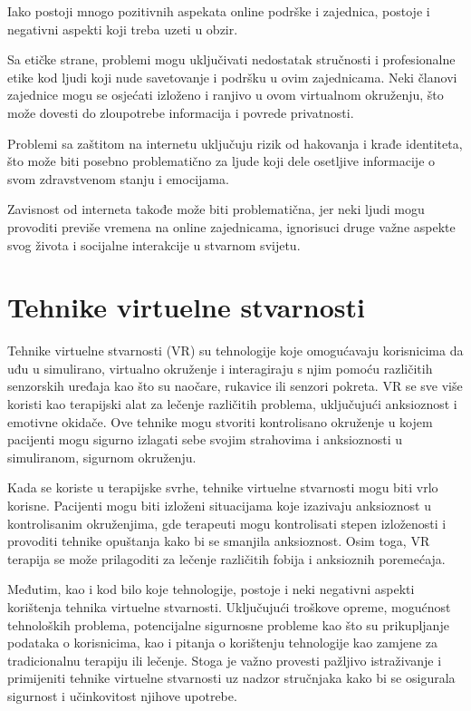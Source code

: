 \documentclass[a4paper]{article}
\begin{document}
Iako postoji mnogo pozitivnih aspekata online podrške i zajednica, postoje i negativni aspekti koji treba uzeti u obzir.

Sa etičke strane, problemi mogu uključivati nedostatak stručnosti i profesionalne etike kod ljudi koji nude savetovanje i podršku u ovim zajednicama. Neki članovi zajednice mogu se osjećati izloženo i ranjivo u ovom virtualnom okruženju, što može dovesti do zloupotrebe informacija i povrede privatnosti.

Problemi sa zaštitom na internetu uključuju rizik od hakovanja i krađe identiteta, što može biti posebno problematično za ljude koji dele osetljive informacije o svom zdravstvenom stanju i emocijama.

Zavisnost od interneta takođe može biti problematična, jer neki ljudi mogu provoditi previše vremena na online zajednicama, ignorisuci druge važne aspekte svog života i socijalne interakcije u stvarnom svijetu.

\section{Tehnike virtuelne stvarnosti}
\label{sec:tehnikeVS}
Tehnike virtuelne stvarnosti (VR) su tehnologije koje omogućavaju korisnicima da uđu u simulirano, virtualno okruženje i interagiraju s njim pomoću različitih senzorskih uređaja kao što su naočare, rukavice ili senzori pokreta. VR se sve više koristi kao terapijski alat za lečenje različitih problema, uključujući anksioznost i emotivne okidače. Ove tehnike mogu stvoriti kontrolisano okruženje u kojem pacijenti mogu sigurno izlagati sebe svojim strahovima i anksioznosti u simuliranom, sigurnom okruženju.

Kada se koriste u terapijske svrhe, tehnike virtuelne stvarnosti mogu biti vrlo korisne. Pacijenti mogu biti izloženi situacijama koje izazivaju anksioznost u kontrolisanim okruženjima, gde terapeuti mogu kontrolisati stepen izloženosti i provoditi tehnike opuštanja kako bi se smanjila anksioznost. Osim toga, VR terapija se može prilagoditi za lečenje različitih fobija i anksioznih poremećaja.

Međutim, kao i kod bilo koje tehnologije, postoje i neki negativni aspekti korištenja tehnika virtuelne stvarnosti. Uključujući troškove opreme, mogućnost tehnoloških problema, potencijalne sigurnosne probleme kao što su prikupljanje podataka o korisnicima, kao i pitanja o korištenju tehnologije kao zamjene za tradicionalnu terapiju ili lečenje. Stoga je važno provesti pažljivo istraživanje i primijeniti tehnike virtuelne stvarnosti uz nadzor stručnjaka kako bi se osigurala sigurnost i učinkovitost njihove upotrebe.
\end{document}
